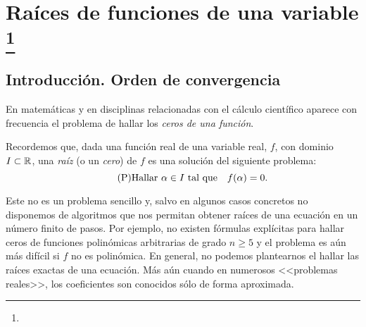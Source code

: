 
\chapter[Raíces de funciones de una variable]{Raíces de funciones de una variable%
  \footnote{\licenseInfo}}
\label{cha:ecuaciones-una-variable}

\section{Introducción. Orden de convergencia}
\label{sec:intro-orden-convergencia}

En matemáticas y en disciplinas relacionadas con el cálculo científico
aparece con frecuencia el problema de hallar los \textit{ceros de una
  función}.
\begin{center}
\end{center}

Recordemos que, dada una función real de una variable real, $f$, con
dominio $I\subset\operatorname{{\mathbb R}}$, una \textit{raíz} (o un \textit{cero}) de $f$
es una solución del siguiente problema:
\begin{equation}
\label{eq:raiz}
\tag{P}
\text{Hallar $\alpha\in I$ tal que} \quad f(\alpha)=0.
\end{equation}


Este no es un problema sencillo y, salvo en algunos casos concretos no
disponemos de algoritmos que nos permitan obtener raíces de una
ecuación en un número finito de pasos. Por ejemplo, no existen
fórmulas explícitas para hallar ceros de funciones polinómicas
arbitrarias de grado $n\ge 5$ y el problema es aún más difícil si $f$
no es polinómica. En general, no podemos plantearnos el hallar las
raíces exactas de una ecuación. Más aún cuando en numerosos <<problemas
reales>>, los coeficientes son conocidos sólo de forma aproximada.

